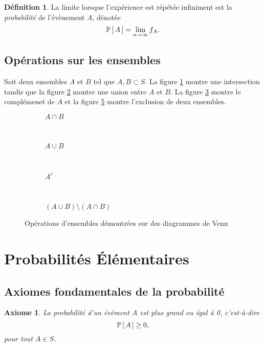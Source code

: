 \documentclass[11pt]{article}
\makeatletter
\renewcommand\P[1]{%
	\ensuremath{%
		\mathbb{P}\left[\,#1\,\right]%
	}%
}%
\newtheorem{axiome}{Axiome}
\theoremstyle{remark}
\theoremstyle{definition}
\newtheorem*{@definition}{Définition}
\newenvironment{definition}{%
	\begin{@definition}%
}{%
	\end{@definition}%
	\setcounter{property}{0}%
}
\makeatother
\begin{document}
\begin{definition}
	La limite lorsque l'expérience est répétée infiniment est la
	\textit{probabilité} de l'évènement $A$, dénotée
	\begin{equation*}
		\P{A}=\lim_{n\rightarrow\infty}f_A.
	\end{equation*}
\end{definition}

\subsection{Opérations sur les ensembles}
Soit deux ensembles $A$ et $B$ tel que $A,B\subset S$. La figure
\ref{fig:venn_intersection} montre une intersection tandis que la figure
\ref{fig:venn_union} montre une union entre $A$ et $B$. La figure
\ref{fig:venn_complement} montre le complémenet de $A$ et la figure
\ref{fig:venn_exclusion} montre l'exclusion de deux ensembles.

\begin{figure}[H]
	\centering
	\begin{subfigure}[H]{0.21\textwidth}
		\centering
		
		\caption{$A\cap B$}
		\label{fig:venn_intersection}
	\end{subfigure}
	~
	\begin{subfigure}[H]{0.21\textwidth}
		\centering
		
		\caption{$A\cup B$}
		\label{fig:venn_union}
	\end{subfigure}
	~
	\begin{subfigure}[H]{0.21\textwidth}
		\centering
		
		\caption{$A^c$}
		\label{fig:venn_complement}
	\end{subfigure}
	~
	\begin{subfigure}[H]{0.21\textwidth}
		\centering
		
		\caption{$\left(A\cup B\right)\setminus\left(A\cap B\right)$}
		\label{fig:venn_exclusion}
	\end{subfigure}
	\caption{Opérations d'ensembles démontrées sur des diagrammes de Venn}
\end{figure}

\section{Probabilités Élémentaires}
\subsection{Axiomes fondamentales de la probabilité}
\begin{axiome}
	La probabilité d'un évèment $A$ est plus grand ou égal à 0, c'est-à-dire
	\begin{equation*}
		\P{A}\geq 0,
	\end{equation*}
	pour tout $A\in S$.
\end{axiome}
\end{document}
